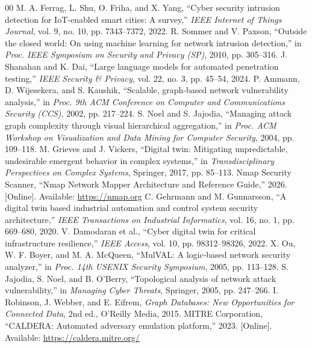 \documentclass[conference]{IEEEtran}
\begin{document}
\begin{thebibliography}{00}
 M. A. Ferrag, L. Shu, O. Friha, and X. Yang, ``Cyber security intrusion detection for IoT-enabled smart cities: A survey,'' \textit{IEEE Internet of Things Journal}, vol. 9, no. 10, pp. 7343--7372, 2022.
 R. Sommer and V. Paxson, ``Outside the closed world: On using machine learning for network intrusion detection,'' in \textit{Proc. IEEE Symposium on Security and Privacy (SP)}, 2010, pp. 305--316.
 J. Shanahan and K. Dai, ``Large language models for automated penetration testing,'' \textit{IEEE Security \& Privacy}, vol. 22, no. 3, pp. 45--54, 2024.
 P. Ammann, D. Wijesekera, and S. Kaushik, ``Scalable, graph-based network vulnerability analysis,'' in \textit{Proc. 9th ACM Conference on Computer and Communications Security (CCS)}, 2002, pp. 217--224.
 S. Noel and S. Jajodia, ``Managing attack graph complexity through visual hierarchical aggregation,'' in \textit{Proc. ACM Workshop on Visualization and Data Mining for Computer Security}, 2004, pp. 109--118.
 M. Grieves and J. Vickers, ``Digital twin: Mitigating unpredictable, undesirable emergent behavior in complex systems,'' in \textit{Transdisciplinary Perspectives on Complex Systems}, Springer, 2017, pp. 85--113.
 Nmap Security Scanner, ``Nmap Network Mapper Architecture and Reference Guide,'' 2026. [Online]. Available: \url{https://nmap.org}
 C. Gehrmann and M. Gunnarsson, ``A digital twin based industrial automation and control system security architecture,'' \textit{IEEE Transactions on Industrial Informatics}, vol. 16, no. 1, pp. 669--680, 2020.
 V. Damodaran et al., ``Cyber digital twin for critical infrastructure resilience,'' \textit{IEEE Access}, vol. 10, pp. 98312--98326, 2022.
 X. Ou, W. F. Boyer, and M. A. McQueen, ``MulVAL: A logic-based network security analyzer,'' in \textit{Proc. 14th USENIX Security Symposium}, 2005, pp. 113--128.
 S. Jajodia, S. Noel, and B. O'Berry, ``Topological analysis of network attack vulnerability,'' in \textit{Managing Cyber Threats}, Springer, 2005, pp. 247--266.
 I. Robinson, J. Webber, and E. Eifrem, \textit{Graph Databases: New Opportunities for Connected Data}, 2nd ed., O'Reilly Media, 2015.
 MITRE Corporation, ``CALDERA: Automated adversary emulation platform,'' 2023. [Online]. Available: \url{https://caldera.mitre.org/}

\end{thebibliography}
\end{document}
